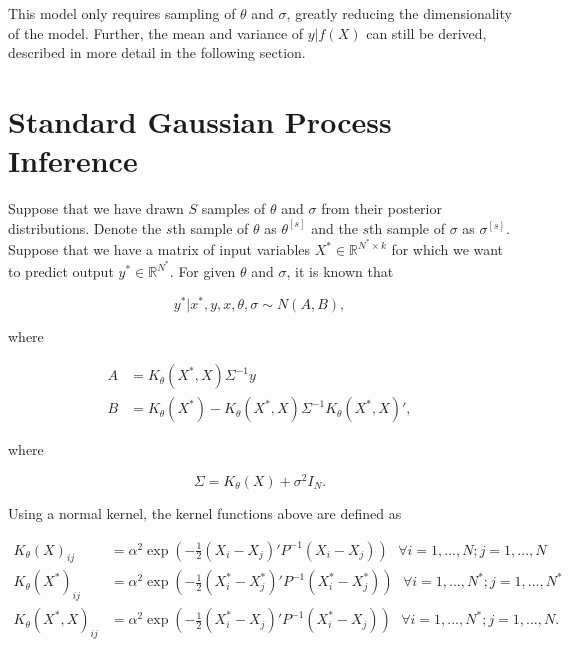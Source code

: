 \documentclass{article}
\newcommand{\RR}{\mathbb{R}}
\newcommand{\sample}[1]{{#1}^{[s]}}
\begin{document}
This model only requires sampling of $\theta$ and $\sigma$, greatly reducing the dimensionality of the model. Further, the mean and variance of $y|f(X)$ can still be derived, described in more detail in the following section.

\section{Standard Gaussian Process Inference}

\label{sec:inference}

Suppose that we have drawn $S$ samples of $\theta$ and $\sigma$ from their posterior distributions. Denote the $s$th sample of $\theta$ as $\sample{\theta}$ and the $s$th sample of $\sigma$ as $\sample{\sigma}$. Suppose that we have a matrix of input variables $X^*\in\RR^{N^*\times k}$ for which we want to predict output $y^*\in\RR^{N^*}$. For given $\theta$ and $\sigma$, it is known that

\begin{equation}
	y^*|x^*, y, x, \theta, \sigma \sim N(A, B),
\end{equation}

\noindent where

\begin{subequations}
\begin{align}
	A &= K_\theta(X^*, X) \Sigma^{-1} y\\
	B &= K_\theta(X^*) - K_\theta(X^*, X) \Sigma^{-1} K_\theta(X^*, X)',
\end{align}
\end{subequations}

\noindent where 

\begin{equation}
	\Sigma = K_\theta(X) + \sigma^2 I_N.
\end{equation}

\noindent Using a normal kernel, the kernel functions above are defined as

\begin{subequations}
\begin{align}
	K_\theta(X)_{ij} &= \alpha^2 \exp\left(-\frac12 (X_i - X_j)' P^{-1} (X_i - X_j)\right)\mbox{\ \ \ \ }\forall i=1,...,N; j=1,...,N\\
	K_\theta(X^*)_{ij} &= \alpha^2 \exp\left(-\frac12 (X^*_i - X^*_j)' P^{-1} (X^*_i - X^*_j)\right)\mbox{\ \ \ \ }\forall i=1,...,N^*; j=1,...,N^*\\
	K_\theta(X^*, X)_{ij} &= \alpha^2 \exp\left(-\frac12 (X^*_i - X_j)' P^{-1} (X^*_i - X_j)\right)\mbox{\ \ \ \ }\forall i=1,...,N^*; j=1,...,N.
\end{align}
\end{subequations}
\end{document}
